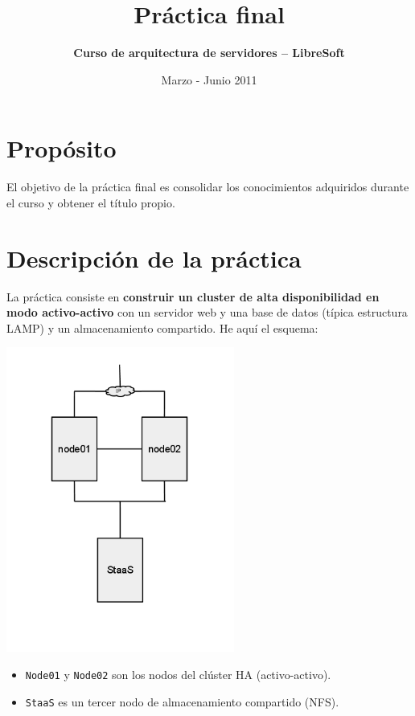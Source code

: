 \documentclass[a4paper,10pt]{article}
\title{\textbf{Práctica final}}
\author{\textbf{Curso de arquitectura de servidores -- LibreSoft}}
\date{Marzo - Junio 2011}
\begin{document}
\maketitle			





\section*{Propósito}

El objetivo de la práctica final es consolidar los conocimientos adquiridos durante el curso y obtener el título propio.


\section{Descripción de la práctica}

La práctica consiste en \textbf{construir un cluster de alta disponibilidad en modo activo-activo} con un servidor web y una base de datos (típica estructura LAMP) y un almacenamiento compartido. He aquí el esquema:


\begin{center}
\includegraphics[width=75mm]{CASUL-Practica.png}
\end{center}

\begin{itemize}
\item \texttt{Node01} y \texttt{Node02} son los nodos del clúster HA (activo-activo). 
\item \texttt{StaaS} es un tercer nodo de almacenamiento compartido (NFS).
\end{itemize}
\end{document}
